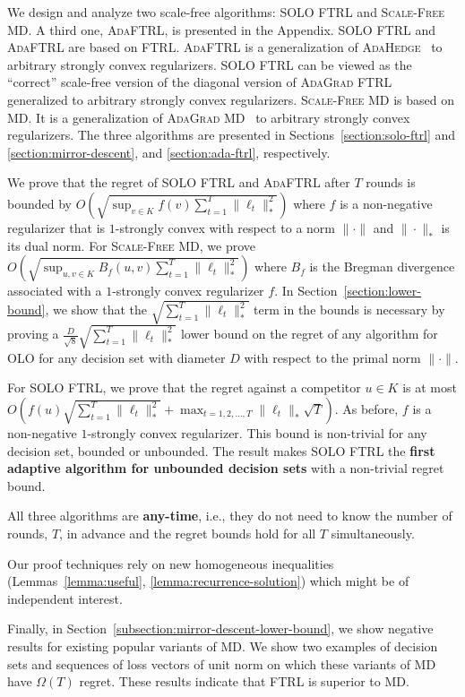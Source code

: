 We design and analyze two scale-free algorithms: \textsc{SOLO FTRL} and
\textsc{Scale-Free MD}.  A third one, \textsc{AdaFTRL}, is presented in
the Appendix. \textsc{SOLO FTRL} and \textsc{AdaFTRL} are based on
\textsc{FTRL}.  \textsc{AdaFTRL} is a generalization of
\textsc{AdaHedge}~\cite{de-Rooij-van-Erven-Grunwald-Koolen-2014} to arbitrary
strongly convex regularizers.  \textsc{SOLO FTRL} can be viewed as the
``correct'' scale-free version of the diagonal version of \textsc{AdaGrad
FTRL}~\cite{Duchi-Hazan-Singer-2011} generalized to arbitrary strongly convex
regularizers.  \textsc{Scale-Free MD} is based on \textsc{MD}. It is a
generalization of \textsc{AdaGrad MD}~\cite{Duchi-Hazan-Singer-2011} to
arbitrary strongly convex regularizers.  The three algorithms are presented in
Sections~\ref{section:solo-ftrl} and \ref{section:mirror-descent}, and
\ref{section:ada-ftrl}, respectively.

We prove that the regret of \textsc{SOLO FTRL} and \textsc{AdaFTRL} after $T$
rounds is bounded by $O (\sqrt{\sup_{v \in K} f(v) \sum_{t=1}^T\|\ell_t\|_*^2} )$
where $f$ is a non-negative regularizer that is $1$-strongly convex with respect
to a norm $\|\cdot\|$ and $\|\cdot\|_*$ is its dual norm. For \textsc{Scale-Free
MD}, we prove $O (\sqrt{\sup_{u,v \in K} B_f(u,v) \sum_{t=1}^T\|\ell_t\|_*^2} )$
where $B_f$ is the Bregman divergence associated with a $1$-strongly convex
regularizer $f$. In Section~\ref{section:lower-bound}, we show that the
$\sqrt{\sum_{t=1}^T \|\ell_t\|_*^2}$ term in the bounds is necessary by proving
a $\frac{D}{\sqrt{8}} \sqrt{\sum_{t=1}^T\|\ell_t\|_*^2}$ lower bound on the
regret of any algorithm for OLO for any decision set with diameter $D$ with
respect to the primal norm $\|\cdot\|$.

For \textsc{SOLO FTRL}, we prove that the regret against a competitor $u \in K$
is at most $O (f(u) \sqrt{\sum_{t=1}^T \|\ell_t\|_*^2} + \max_{t=1,2,\dots,T}
\|\ell_t\|_* \sqrt{T} )$.  As before, $f$ is a non-negative $1$-strongly convex
regularizer. This bound is non-trivial for any decision set, bounded or
unbounded.  The result makes \textsc{SOLO FTRL} the \textbf{first adaptive
algorithm for unbounded decision sets} with a non-trivial regret bound.

All three algorithms are \textbf{any-time}, i.e., they do not need to know the
number of rounds, $T$, in advance and the regret bounds hold for all $T$
simultaneously.

Our proof techniques rely on new homogeneous
inequalities (Lemmas~\ref{lemma:useful}, \ref{lemma:recurrence-solution})
which might be of independent interest.

Finally, in Section~\ref{subsection:mirror-descent-lower-bound}, we show
negative results for existing popular variants of \textsc{MD}. We show two
examples of decision sets and sequences of loss vectors of unit norm on which
these variants of \textsc{MD} have $\Omega(T)$ regret.  These results indicate
that \textsc{FTRL} is superior to \textsc{MD}.

